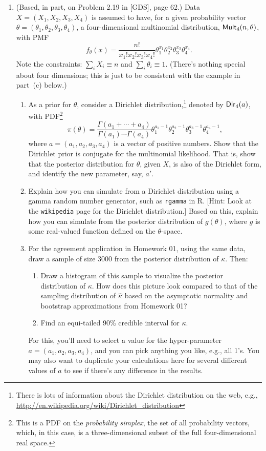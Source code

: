\documentclass[a4paper,12pt]{article}
\begin{document}
\begin{enumerate}
\item (Based, in part, on Problem 2.19 in [GDS], page 62.)  Data $X=(X_1,X_2,X_3,X_4)$ is assumed to have, for a given probability vector $\theta=(\theta_1,\theta_2,\theta_3,\theta_4)$, a four-dimensional multinomial distribution, ${\sf Mult}_4(n,\theta)$, with PMF
\[ f_\theta(x) = \frac{n!}{x_1! x_2! x_3! x_4!} \theta_1^{x_1} \theta_2^{x_2} \theta_3^{x_3} \theta_4^{x_4}. \]
Note the constraints: $\sum_i X_i \equiv n$ and $\sum_i \theta_i \equiv 1$.  (There's nothing special about four dimensions; this is just to be consistent with the example in part~(c) below.)
\begin{enumerate}
\item As a prior for $\theta$, consider a Dirichlet distribution,\footnote{There is lots of information about the Dirichlet distribution on the web, e.g., \url{http://en.wikipedia.org/wiki/Dirichlet_distribution}} denoted by ${\sf Dir}_4(a)$, with PDF\footnote{This is a PDF on the \emph{probability simplex}, the set of all probability vectors, which, in this case, is a three-dimensional subset of the full four-dimensional real space.} 
\[ \pi(\theta) = \frac{\Gamma(a_1 + \cdots + a_4)}{\Gamma(a_1) \cdots \Gamma(a_4)} \theta_1^{a_1-1} \theta_2^{a_2-1} \theta_3^{a_3-1} \theta_4^{a_4-1}, \]
where $a=(a_1,a_2,a_3,a_4)$ is a vector of positive numbers.  Show that the Dirichlet prior is conjugate for the multinomial likelihood.  That is, show that the posterior distribution for $\theta$, given $X$, is also of the Dirichlet form, and identify the new parameter, say, $a'$.  
\item Explain how you can simulate from a Dirichlet distribution using a gamma random number generator, such as {\tt rgamma} in R.  [Hint: Look at the {\tt wikipedia} page for the Dirichlet distribution.]  Based on this, explain how you can simulate from the posterior distribution of $g(\theta)$, where $g$ is some real-valued function defined on the $\theta$-space.  
\item For the agreement application in Homework 01, using the same data, draw a sample of size 3000 from the posterior distribution of $\kappa$.  Then:
\begin{enumerate}
\item Draw a histogram of this sample to visualize the posterior distribution of $\kappa$.  How does this picture look compared to that of the sampling distribution of $\hat\kappa$ based on the asymptotic normality and bootstrap approximations from Homework 01?
\item Find an equi-tailed 90\% credible interval for $\kappa$.  
\end{enumerate}
For this, you'll need to select a value for the hyper-parameter $a=(a_1,a_2,a_3,a_4)$, and you can pick anything you like, e.g., all 1's.  You may also want to duplicate your calculations here for several different values of $a$ to see if there's any difference in the results.  
\end{enumerate}

\end{enumerate}
\end{document}
